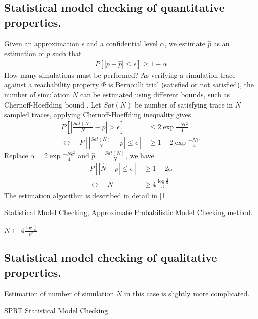\subsection{Statistical model checking of quantitative properties.}
Given an approximation $\epsilon$ and a confidential
level $\alpha$, we estimate $\hat{p}$ as an estimation of $p$ such that
\begin{align*}
    P[|p-\hat{p}| \leq \epsilon] \geq 1 - \alpha
\end{align*}
How many simulations must be performed?  As verifying a simulation trace against a reachability
property $\Phi$ is Bernoulli trial (satisfied or not satisfied), the number of simulation $N$ can be
estimated using different bounds, such as Chernoff-Hoeffding bound \cite{chernoff2014career}. Let
$Sat(N)$ be number of satisfying trace in $N$ sampled traces, applying Chernoff-Hoeffding inequality
gives
\begin{align*}
    P[|\frac{Sat(N)}{N}-p| > \epsilon]                          & \leq 2\exp{\frac{-N\epsilon^2}{4}}     \\
    \leftrightarrow \quad P[|\frac{Sat(N)}{N}-p| \leq \epsilon] & \geq 1 - 2\exp{\frac{-N\epsilon^2}{4}}
\end{align*}
Replace $\alpha = 2\exp{\frac{-N\epsilon^2}{4}}$ and $\hat{p}=\frac{Sat(N)}{N}$, we have
\begin{align*}
    P[|\hat{N} - p| \leq \epsilon] & \geq 1 - 2\alpha                                \\
    \leftrightarrow \quad N        & \geq 4\frac{\log{\frac{2}{\alpha}}}{\epsilon^2}
\end{align*}
The estimation algorithm is described in detail in [1].
\begin{algorithm}[H]
    \caption{Statistical Model Checking, Approximate Probabilistic Model Checking method.}
    \label{alg:smc-apmc}
    \begin{algorithmic}[1]
        \State $N \leftarrow 4\frac{\log{\frac{2}{\alpha}}}{\epsilon^2}$
        \EndProcedure
    \end{algorithmic}
\end{algorithm}

\subsection{Statistical model checking of qualitative properties.}
Estimation of number of simulation $N$ in this case is slightly more complicated.
\begin{algorithm}[H]
    \caption{SPRT Statistical Model Checking}
    \label{alg:smc-sprt}
    \begin{algorithmic}[1]
        \EndProcedure
    \end{algorithmic}
\end{algorithm}

